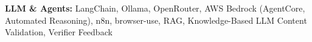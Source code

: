 \textbf{LLM \& Agents:} LangChain, Ollama, OpenRouter, AWS Bedrock (AgentCore, Automated Reasoning), n8n, browser-use, RAG, Knowledge-Based LLM Content Validation, Verifier Feedback

